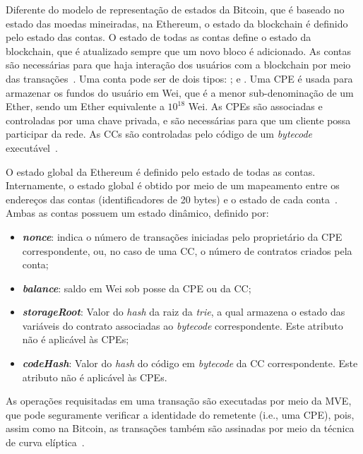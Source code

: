 Diferente do modelo de representação de estados da Bitcoin, que é baseado no estado das moedas mineiradas, na Ethereum, o estado da blockchain é definido pelo estado das contas. O estado de todas as contas define o estado da blockchain, que é atualizado sempre que um novo bloco é adicionado. As contas são necessárias para que haja interação dos usuários com a blockchain por meio das transações~\cite{ethereum-homestead2020documentation}. Uma conta pode ser de dois tipos: ; e . Uma CPE é usada para armazenar os fundos do usuário em Wei, que é a menor sub-denominação de um Ether, sendo um Ether equivalente a $10^{18}$ Wei. As CPEs são associadas e controladas por uma chave privada, e são necessárias para que um cliente possa participar da rede. As CCs são controladas pelo código de um \textit{bytecode} executável~\cite{chen2020survey-ethereum-acm}. 

O estado global da Ethereum é definido pelo estado de todas as contas. Internamente, o estado global é obtido por meio de um mapeamento entre os endereços das contas (identificadores de 20 bytes) e o estado de cada conta~\cite{wood2014ethereum-yellow-paper}. Ambas as contas possuem um estado dinâmico, definido por: 
\begin{itemize}
    \item \textbf{\textit{nonce}}: indica o número de transações iniciadas pelo proprietário da CPE correspondente, ou, no caso de uma CC, o número de contratos criados pela conta;
    \item \textbf{\textit{balance}}: saldo em Wei sob posse da CPE ou da CC;
    \item \textbf{\textit{storageRoot}}: Valor do \textit{hash} da raiz da \textit{trie}, a qual armazena o estado das variáveis do contrato associadas ao \textit{bytecode} correspondente. Este atributo não é aplicável às CPEs;
    \item \textbf{\textit{codeHash}}: Valor do \textit{hash} do código em \textit{bytecode} da CC correspondente. Este atributo não é aplicável às CPEs.
\end{itemize}

As operações requisitadas em uma transação são executadas por meio da MVE, que pode seguramente verificar a identidade do remetente (i.e., uma CPE), pois, assim como na Bitcoin, as transações também são assinadas por meio da técnica de curva elíptica~\cite{ethereum-homestead2020documentation}.

